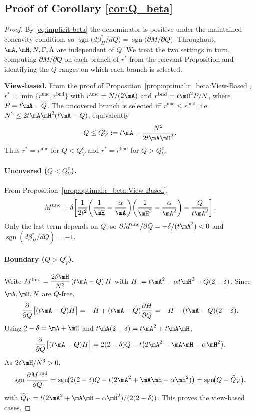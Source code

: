 \subsection*{Proof of Corollary \ref{cor:Q_beta}}
\begin{proof}
By \eqref{eq:implicit-beta} the denominator is positive under the maintained
concavity condition, so
$\operatorname{sgn}\!\bigl(d\beta_H^*/dQ\bigr)=\operatorname{sgn}\!\bigl(\partial M/\partial Q\bigr)$. 
Throughout, $\mA,\mH,N,\Gamma,\Lambda$ are independent of $Q$. We treat the two
settings in turn, computing $\partial M/\partial Q$ on each branch of $r^{*}$ from the
relevant Proposition and identifying the $Q$-ranges on which each branch is selected.


\textbf{View-based.}
From the proof of Proposition~\ref{prop:optimal:r_beta:View-Based},
$r^{*}=\min\{r^{\mathrm{unc}},r^{\mathrm{bnd}}\}$ with
$r^{\mathrm{unc}}=N/(2\mA)$ and $r^{\mathrm{bnd}}=t\mH^{2}P/N$, where $P=t\mA-Q$.
The uncovered branch is selected iff $r^{\mathrm{unc}}\le r^{\mathrm{bnd}}$, i.e.
$N^{2}\le 2t\mA\mH^{2}(t\mA-Q)$, equivalently
\[
Q\le Q^{c}_{V}:=t\mA-\frac{N^{2}}{2t\mA\mH^{2}} .
\]
Thus $r^{*}=r^{\mathrm{unc}}$ for $Q<Q^{c}_{V}$ and $r^{*}=r^{\mathrm{bnd}}$ for
$Q>Q^{c}_{V}$.

\paragraph{Uncovered ($Q<Q^{c}_{V}$).}
From Proposition~\ref{prop:optimal:r_beta:View-Based},
\[
M^{\mathrm{unc}}=\delta\!\left[\frac{1}{2t^{2}}\!\left(\frac{1}{\mH}+\frac{\alpha}{\mA}\right)\!
\left(\frac{1}{\mH^{2}}-\frac{\alpha}{\mA^{2}}\right)-\frac{Q}{t\mA^{2}}\right].
\]
Only the last term depends on $Q$, so
$\partial M^{\mathrm{unc}}/\partial Q=-\delta/(t\mA^{2})<0$ and
$\operatorname{sgn}(d\beta_H^*/dQ)=-1$.

\paragraph{Boundary ($Q>Q^{c}_{V}$).}
Write $M^{\mathrm{bnd}}=\dfrac{2\delta\mH}{N^{3}}\,(t\mA-Q)\,H$ with
$H:=t\mA^{2}-\alpha t\mH^{2}-Q(2-\delta)$. Since $\mA,\mH,N$ are $Q$-free,
\[
\frac{\partial}{\partial Q}\bigl[(t\mA-Q)H\bigr]
=-H+(t\mA-Q)\frac{\partial H}{\partial Q}
=-H-(t\mA-Q)(2-\delta).
\]
Using $2-\delta=\mA+\mH$ and $t\mA(2-\delta)=t\mA^{2}+t\mA\mH$,
\[
\frac{\partial}{\partial Q}\bigl[(t\mA-Q)H\bigr]
=2(2-\delta)Q-t\bigl(2\mA^{2}+\mA\mH-\alpha\mH^{2}\bigr).
\]
As $2\delta\mH/N^{3}>0$,
\[
\operatorname{sgn}\frac{\partial M^{\mathrm{bnd}}}{\partial Q}
=\operatorname{sgn}\!\bigl(2(2-\delta)Q-t(2\mA^{2}+\mA\mH-\alpha\mH^{2})\bigr)
=\operatorname{sgn}\!\bigl(Q-\widehat Q_{V}\bigr),
\]
with $\widehat Q_{V}=t(2\mA^{2}+\mA\mH-\alpha\mH^{2})/(2(2-\delta))$. This proves the
view-based cases.



\end{proof}
